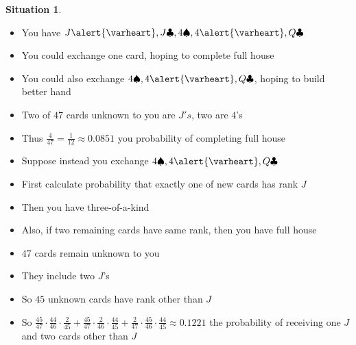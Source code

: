 \documentclass[handout]{beamer}
\theoremstyle{definition}
\newtheorem{situation}{Situation}
\newcommand{\hs}{\alert{\varheart}}
\newcommand{\s}{\spadesuit}
\newcommand{\cs}{\clubsuit}
\begin{document}
\begin{frame}
\begin{situation}
\begin{itemize}
\item You have $J\hs,J\cs,4\s,4\hs,Q\cs$
\item You could exchange one card, hoping to complete full house
\item You could also exchange $4\s,4\hs,Q\cs$, hoping to build better hand
\end{itemize}
\end{situation}
\begin{itemize}
\item Two of $47$ cards unknown to you are $J's$, two are $4$'s
\item Thus $\frac{4}{47}=\frac{1}{12}\approx 0.0851$ you probability
of completing full house
\end{itemize}
\end{frame}

\begin{frame}
\begin{itemize}
\item Suppose instead you exchange $4\s,4\hs,Q\cs$
\item First calculate probability that exactly one of new cards
has rank $J$
\item Then you have three-of-a-kind
\item Also, if two remaining cards have same rank,
then you have full house
\item $47$ cards remain unknown to you
\item They include two $J$'s
\item So $45$ unknown cards have rank other than $J$
\item So $\frac{45}{47}\cdot\frac{44}{46}\cdot\frac{2}{45}
+\frac{45}{47}\cdot\frac{2}{46}\cdot\frac{44}{45}
+\frac{2}{47}\cdot\frac{45}{46}\cdot\frac{44}{45}\approx 0.1221$
the probability of receiving one $J$ and two cards other than $J$
\end{itemize}
\end{frame}
\end{document}

